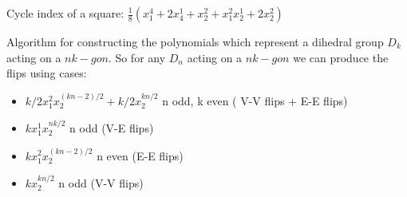 \documentclass{beamer}
\begin{document}
\begin{frame}
Cycle index of a square:
$\frac{1}{8}(x_1^4+2x_4^1+x_2^2+x_1^2x_2^1+2x_2^2)$\\

\begin{table}
\caption{$D_4 \circlearrowright 4n-gon$}
\end{table}
\end{frame}
\begin{frame}{Algorithm for constructing the polynomials  which represent a dihedral group $D_k$ acting on a $nk-gon$.}
So for any $D_n$ acting on a $nk-gon$ we can produce the flips using cases:\\

			\begin{itemize}
    			\item $k/2x_1^2x_2^{(kn-2)/2}+k/2x_2^{kn/2}$ n odd, k even ( V-V flips + E-E flips)
                \item $kx_1^1x_2^{nk/2}$ n odd (V-E flips)
                \item $kx_1^2x_2^{(kn-2)/2}$ n even (E-E flips)
                \item $kx_2^{kn/2}$ n odd (V-V flips)
             \end{itemize}

\end{frame}
\end{document}
